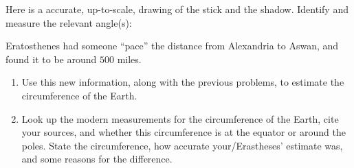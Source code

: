 \documentclass[noauthor,nooutcomes,handout]{ximera}
\begin{document}
  \begin{question} Here is a accurate, up-to-scale, drawing of the stick and the shadow.  Identify and measure the relevant angle(s):
    \begin{center}
    \end{center}

 \end{question}
 \mynewpage

\begin{question}
Eratosthenes had someone ``pace'' the distance from Alexandria
    to Aswan, and found it to be around $500$ miles. 
    
\begin{enumerate}
 \item  Use this new information, along with the previous problems, to estimate the circumference of the Earth. 
 \item Look up the modern measurements for the circumference of the Earth, cite your sources, and whether this circumference is at the equator or around the poles. State the circumference, how accurate your/Erastheses' estimate was, and some reasons for the difference.
\end{enumerate}

 \end{question}
\end{document}
